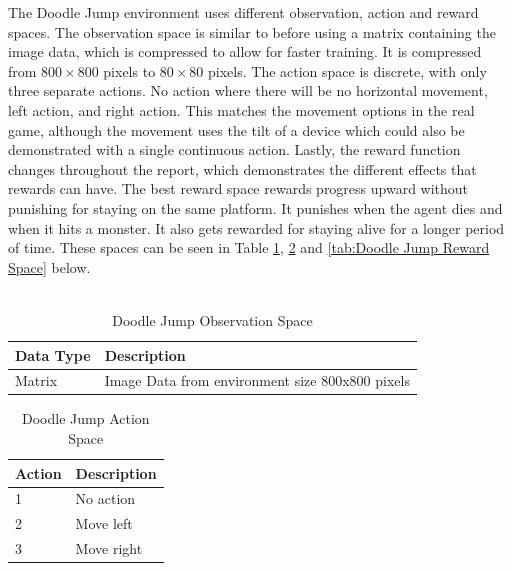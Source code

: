 \documentclass[a4paper,12pt]{article}
\begin{document}
\noindent
The Doodle Jump environment uses different observation, action and reward spaces. The observation space is similar to before using a matrix containing the image data, which is compressed to allow for faster training. It is compressed from $800\times800$ pixels to $80\times80$ pixels. The action space is discrete, with only three separate actions. No action where there will be no horizontal movement, left action, and right action. This matches the movement options in the real game, although the movement uses the tilt of a device which could also be demonstrated with a single continuous action. Lastly, the reward function changes throughout the report, which demonstrates the different effects that rewards can have. The best reward space rewards progress upward without punishing for staying on the same platform. It punishes when the agent dies and when it hits a monster. It also gets rewarded for staying alive for a longer period of time. These spaces can be seen in Table \ref{tab:Doodle Jump Observation Space}, \ref{tab:Doodle Jump Action Space} and \ref{tab:Doodle Jump Reward Space} below.
\\\\
\begin{table}[H]
\centering
\caption{Doodle Jump Observation Space}
\label{tab:Doodle Jump Observation Space}
\begin{tabular}{|ll|}
\hline
\textbf{Data Type} & \textbf{Description}\\ \hline
Matrix & Image Data from environment size 800x800 pixels\\ \hline
\end{tabular}
\end{table}

\begin{table}[H]
\centering
\caption{Doodle Jump Action Space}
\label{tab:Doodle Jump Action Space}
\begin{tabular}{|ll|}
\hline
\textbf{Action} & \textbf{Description}\\ \hline
1 & No action\\ 
2 & Move left \\ 
3 & Move right \\ \hline
\end{tabular}
\end{table}
\end{document}
